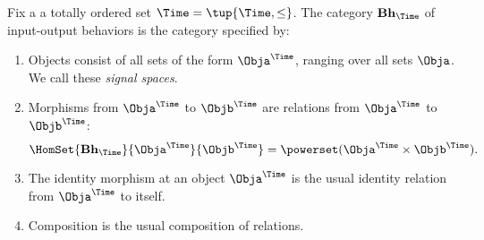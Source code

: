 \begin{definition}
Fix a a totally ordered set $\Time = \tup{\Time, \leq}$.
The category $\textbf{Bh}_\Time$ of input-output behaviors is the category specified by: 
\begin{enumerate}
\item Objects consist of all sets of the form $\Obja^\Time$, ranging over all sets $\Obja$. We call these \emph{signal spaces}. 
\item Morphisms from $\Obja^\Time$ to $\Objb^\Time$ are relations from $\Obja^\Time$ to $\Objb^\Time$: 
\begin{equation}
\HomSet{\textbf{Bh}_\Time}{\Obja^\Time}{\Objb^\Time} = \powerset (\Obja^\Time \times \Objb^\Time). 
\end{equation}
\item The identity morphism at an object $\Obja^\Time$ is the usual identity relation from $\Obja^\Time$ to itself. 
\item Composition is the usual composition of relations. 
\end{enumerate} 

\end{definition}
